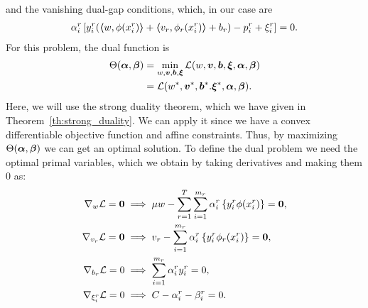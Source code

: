 and the vanishing dual-gap conditions, which, in our case are
\begin{align}
    \alpha_i^r \left[ y_{i}^r (\dotp{w}{\phi(x_{i}^r)} + \dotp{v_r}{\phi_r(x_{i}^r)} + b_r) - p_{i}^r + \xi_{i}^r \right] = 0 . \label{eq:dualgap_vanish}
\end{align}
For this problem, the dual function is
\begin{equation}\nonumber
    \begin{aligned}
         \Theta(\bm{\alpha}, \bm{\beta}) &=  \min_{{w}, \bm{v}, \bm{b}, \bm{\xi}} \mathcal{L}({w}, \bm{v}, \bm{b}, \bm{\xi}, \bm{\alpha}, \bm{\beta}) \\
         &= \mathcal{L}({{w}}^*, {\bm{v}}^*, {\bm{b}}^*. {\bm{\xi}}^*, \bm{\alpha}, \bm{\beta}) .
    \end{aligned}    
\end{equation}
Here, we will use the strong duality theorem, which we have given in Theorem~\ref{th:strong_duality}. We can apply it since we have a convex differentiable objective function and affine constraints.
Thus, by maximizing $\Theta(\bm{\alpha}, \bm{\beta})$ we can get an optimal solution.
To define the dual problem we need the optimal primal variables, which we obtain by taking derivatives and making them $0$ as:
\begin{align}
    \grad_{{w}} \lagr  = \fv{0}  &\implies \mu {{w}} - \sum_{r= 1}^T \sum_{i=1}^{m_r} {\alpha_i^r} \left\lbrace y_i^r \phi(x_i^r) \right\rbrace = \fv{0} , \label{eq:common_repr_add} \\
    \grad_{{v}_r} \lagr  = \fv{0} &\implies {{v}_r} - \sum_{i=1}^{m_r} {\alpha_i^r} \left\lbrace y_i^r \phi_r(x_i^r) \right\rbrace = \fv{0} , \label{eq:specific_repr_add} \\
    \grad_{b_r} \lagr  = 0 &\implies \sum_{i=1}^{m_r} {\alpha_i^r} y_i^r = 0 , \label{eq:specific_eqconstr_add} \\
    \grad_{\xi_i^r} \lagr  = 0 &\implies C - {\alpha_i^r} - {\beta_i^r} = 0 .\label{eq:xi_feas_add}
\end{align}
